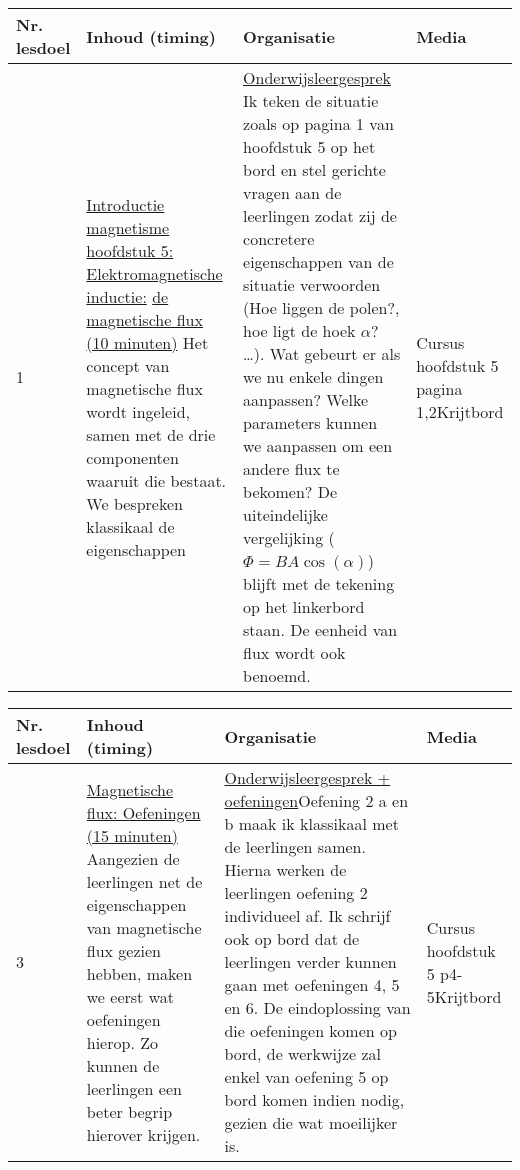 \begin{landscape}
\newpage
	

\begin{tabularx}{1.56\textwidth}{|p{1.5cm}|p{9cm}|X|p{4cm}|}
	\hline
	\textbf{Nr. lesdoel } & \textbf{Inhoud (timing)}  & \textbf{Organisatie } & \textbf{Media } \\ \hline
	 1\newline\newline 2&\underline{Introductie magnetisme hoofdstuk 5:  } \underline{ Elektromagnetische inductie:} \underline{de magnetische flux (10 minuten)}\newline
	Het concept van magnetische flux wordt ingeleid, samen met de drie componenten waaruit die bestaat. We bespreken klassikaal de eigenschappen
	&  \underline{Onderwijsleergesprek}\newline 
	Ik teken de situatie zoals op pagina 1 van hoofdstuk 5 op het bord en stel gerichte vragen aan de leerlingen zodat zij de concretere eigenschappen van de situatie verwoorden (Hoe liggen de polen?, hoe ligt de hoek $\alpha$? \ldots). Wat gebeurt er als we nu enkele dingen aanpassen? Welke parameters kunnen we aanpassen om een andere flux te bekomen?	De uiteindelijke vergelijking ($\Phi = BA\cos(\alpha)$) blijft met de tekening op het linkerbord staan. De eenheid van flux wordt ook benoemd.
	&  Cursus hoofdstuk 5 pagina 1,2\newline\newline Krijtbord
	\\ \hline
\end{tabularx}

\begin{tabularx}{1.56\textwidth}{|p{1.5cm}|p{8cm}|X|p{3cm}|}
	\hline
	\textbf{Nr. lesdoel } & \textbf{Inhoud (timing)}  & \textbf{Organisatie } & \textbf{Media } \\ \hline
	3& \underline{Magnetische flux: Oefeningen (15 minuten)}\newline
	Aangezien de leerlingen net de eigenschappen van magnetische flux gezien hebben, maken we eerst wat oefeningen hierop. Zo kunnen de leerlingen een beter begrip hierover krijgen.
	&  \underline{Onderwijsleergesprek + oefeningen}\newline  Oefening 2 a en b maak ik klassikaal met de leerlingen samen. Hierna werken de leerlingen oefening 2 individueel af. Ik schrijf ook op bord dat de leerlingen verder kunnen gaan met oefeningen 4, 5 en 6. De eindoplossing van die oefeningen komen op bord, de werkwijze zal enkel van oefening 5 op bord komen indien nodig, gezien die wat moeilijker is.
	&  Cursus hoofdstuk 5 p4-5\newline\newline Krijtbord
	\\ \hline
\end{tabularx}\vspace{5mm}



\end{landscape}
